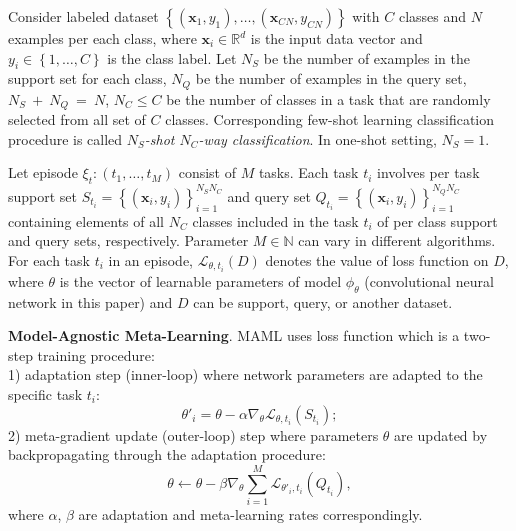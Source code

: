 \documentclass{article}
\begin{document}
Consider labeled dataset $\left\lbrace (\mathbf{x}_1, y_1),\ldots, (\mathbf{x}_{CN}, y_{CN})  \right\rbrace$ with $C$ classes and $N$ examples per each class, where $\mathbf{x}_i \in \mathbb{R}^d$ is the input data vector and $y_i \in \left\lbrace 1,\ldots, C \right\rbrace$ is the class label. Let $N_S$ be the number of examples in the support set for each class, $N_Q$ be the number of examples in the query set, $N_S~+~N_Q~=~N$, $N_C \leq C$ be the number of classes in a task that are randomly selected from all set of $C$ classes. Corresponding few-shot learning classification procedure is called {\it $N_S$-shot $N_C$-way classification}. In one-shot setting, $N_S=1$.

Let episode $\xi_t: (t_1, \ldots, t_M)$ consist of $M$ tasks. Each task $t_i$ 
involves per task support set $S_{t_i}=\left\lbrace (\mathbf{x}_i, y_i) \right\rbrace_{i=1}^{N_S N_C}$ and query set $Q_{t_i}=\left\lbrace (\mathbf{x}_i, y_i) \right\rbrace_{i=1}^{N_Q N_C}$ containing elements of all $N_C$ classes included in the task $t_i$ of per class support and query sets, respectively. Parameter $M \in \mathbb{N}$ can vary in different algorithms. For each task $t_i$ in an episode, $\mathcal{L}_{\theta, t_i} (D)$ denotes the value of loss function on $D$, where $\theta$ is the vector of learnable parameters of model $\phi_{\theta}$ (convolutional neural network in this paper) and $D$ can be support, query, or another dataset. 

{\bf Model-Agnostic Meta-Learning}. MAML uses loss function which is a two-step training procedure: \\1) adaptation step (inner-loop) where network parameters are adapted to the specific task $t_i$:
\begin{equation}\label{inner_loss}
	\theta'_i=\theta-\alpha\nabla_{\theta}\mathcal{L}_{\theta, t_i} (S_{t_i});
\end{equation}
2) meta-gradient update (outer-loop) step where parameters $\theta$ are updated by backpropagating through the adaptation procedure: 
\begin{equation}\label{outer_loss}
	\theta \leftarrow \theta - \beta \nabla_{\theta} \sum_{i=1}^{M} { \mathcal{L}_{\theta'_i, t_i} (Q_{t_i})},
\end{equation} 
where $\alpha$, $\beta$ are adaptation and meta-learning rates correspondingly.
\end{document}
